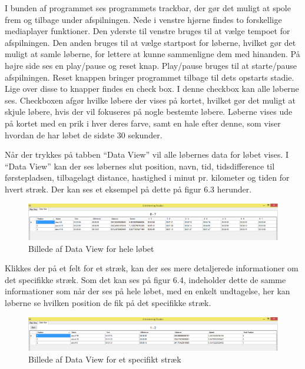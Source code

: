 I bunden af programmet ses programmets trackbar, der gør det muligt at spole frem og tilbage under afspilningen. Nede i venstre hjørne findes to forskellige mediaplayer funktioner. Den yderste til venstre bruges til at vælge tempoet for afspilningen. Den anden bruges til at vælge startpost for løberne, hvilket gør det muligt at samle løberne, for lettere at kunne sammenligne dem med hinanden. På højre side ses en play/pause og  reset knap. Play/pause bruges til at starte/pause afspilningen. Reset knappen bringer programmet tilbage til dets opstarts stadie. Lige over disse to knapper findes en check box. I denne checkbox kan alle løberne ses. Checkboxen afgør hvilke løbere der vises på kortet, hvilket gør det muligt at skjule løbere, hvis der vil fokuseres på nogle bestemte løbere. Løberne vises ude på kortet med en prik i hver deres farve, samt en hale efter denne, som viser hvordan de har løbet de sidste 30 sekunder. 

Når der trykkes på tabben “Data View” vil alle løbernes data for løbet vises. I “Data View” kan der ses løbernes slut position, navn, tid, tidsdifference til førstepladsen, tilbagelagt distance, hastighed i minut pr. kilometer og tiden for hvert stræk. Der kan ses et eksempel på dette på figur 6.3 herunder. 
\begin{figure} [h]
	\centering
	\includegraphics[width=1\textwidth]{billeder/DataView1}
	\caption{Billede af Data View for hele løbet}
\end{figure}

Klikkes der på et felt for et stræk, kan der ses mere detaljerede informationer om det specifikke stræk. Som det kan ses på figur 6.4, indeholder dette de samme informationer som når der ses på hele løbet, med en enkelt undtagelse, her kan løberne se hvilken position de fik på det specifikke stræk. 
\begin{figure} [h]
	\centering
	\includegraphics[width=1\textwidth]{billeder/DataView2}
	\caption{Billede af Data View for et specifikt stræk}
\end{figure}

